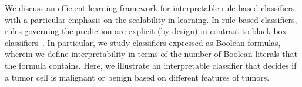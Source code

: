 \label{chapter:imli}
We discuss an efficient learning framework for interpretable rule-based classifiers with a particular emphasis on the scalability in learning. In rule-based classifiers, rules governing the prediction are explicit (by design) in contrast to black-box classifiers~\cite{rudin2019stop}. 
In particular, we study classifiers expressed as Boolean formulas, wherein we define interpretability in terms of the number of Boolean literals that the formula contains. Here, we illustrate an interpretable classifier that decides if a tumor cell is malignant or benign based on different features of tumors.

\vspace{1em}
\vspace{1em}


